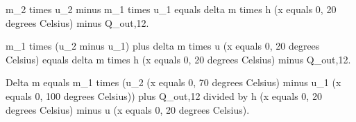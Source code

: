 m_2 times u_2 minus m_1 times u_1 equals delta m times h (x equals 0, 20 degrees Celsius) minus Q_out,12.  

m_1 times (u_2 minus u_1) plus delta m times u (x equals 0, 20 degrees Celsius) equals delta m times h (x equals 0, 20 degrees Celsius) minus Q_out,12.  

Delta m equals m_1 times (u_2 (x equals 0, 70 degrees Celsius) minus u_1 (x equals 0, 100 degrees Celsius)) plus Q_out,12 divided by h (x equals 0, 20 degrees Celsius) minus u (x equals 0, 20 degrees Celsius).